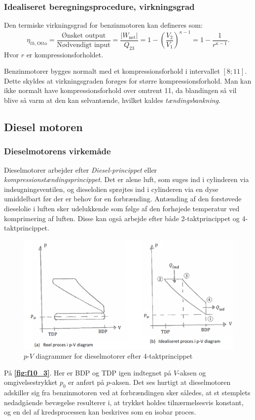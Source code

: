 \subsubsection{Idealiseret beregningsprocedure, virkningsgrad}
Den termiske virkningsgrad for benzinmotoren kan defineres som:
\[ 
\eta_{th, \mathrm{Otto}} = \frac{\text{Ønsket output}}{\text{Nødvendigt input}} = \frac{\left| W_{\mathrm{net}} \right|}{Q_{23}} = 1 - \left( \frac{V_2}{V_1} \right)^{\kappa - 1} = 1 - \frac{1}{r^{\kappa - 1}}
.\]
Hvor $r$ er kompressionsforholdet.

Benzinmotorer bygges normalt med et kompressionsforhold i intervallet $[8;11]$. Dette skyldes at virkningsgraden forøges for større kompressionsforhold. Man kan ikke normalt have kompressionsforhold over omtrent 11, da blandingen så vil blive så varm at den kan selvantænde, hvilket kaldes \textit{tændingsbankning}.


\subsection{Diesel motoren}

\subsubsection{Dieselmotorens virkemåde}
Dieselmotorer arbejder efter \textit{Diesel-princippet} eller \textit{kompressionstændingsprincippet}. Det er alene luft, som suges ind i cylinderen via indsugningsventilen, og dieselolien sprøjtes ind i cylinderen via en dyse umiddelbart før der er behov for en forbrænding. Antænding af den forstøvede dieselolie i luften sker udelukkende som følge af den forhøjede temperatur ved komprimering af luften. Disse kan også arbejde efter både 2-taktprincippet og 4-taktprincippet. 

\begin{figure} [ht]
  \centering
  \includegraphics[width=0.5\linewidth]{./figures/f10_3.png}
  \caption{$p$-$V$ diagrammer for dieselmotorer efter 4-taktprincippet}
  \label{fig:f10_3}
\end{figure}

På \textbf{\autoref{fig:f10_3}}. Her er BDP og TDP igen indtegnet på $V$-aksen og omgivelsestrykket $p_0$ er anført på $p$-aksen. Det ses hurtigt at dieselmotoren adskiller sig fra benzinmotoren ved at forbrændingen sker således, at st stemplets nedadgående bevægelse resulterer i, at trykket holdes tilnærmelsesvis konstant, og en del af kredsprocessen kan beskrives som en isobar proces.

